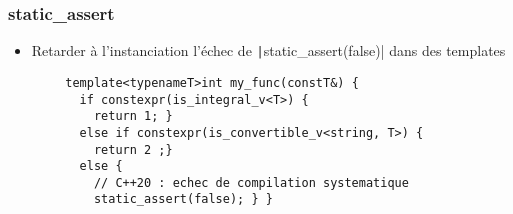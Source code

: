 \documentclass[C++.tex]{subfiles}
\begin{document}
\begin{frame}[fragile]
	\frametitle{static\_assert}
	\begin{itemize}
		\item Retarder à l'instanciation l'échec de \texttt|static_assert(false)| dans des templates
	\end{itemize}

	\begin{verbatim}
		template<typenameT>int my_func(constT&) {
		  if constexpr(is_integral_v<T>) {
		    return 1; } 
		  else if constexpr(is_convertible_v<string, T>) {
		    return 2 ;}
		  else {
		    // C++20 : echec de compilation systematique
		    static_assert(false); } }
	\end{verbatim}

\end{frame}
\end{document}
